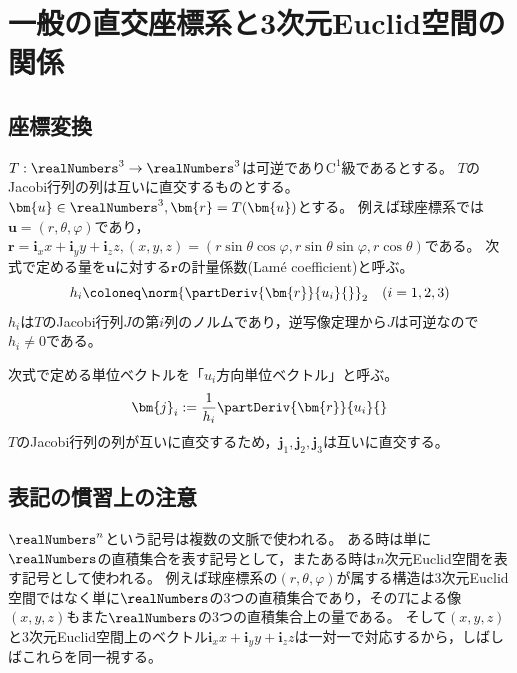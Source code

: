 \chapter{一般の直交座標系と3次元Euclid空間の関係}
    \section{座標変換}
        $T:\realNumbers^3\to\realNumbers^3$は可逆であり$\mathrm{C}^1$級であるとする。
        $T$のJacobi行列の列は互いに直交するものとする。
        $\bm{u}\in\realNumbers^3,\bm{r} = T(\bm{u})$とする。
        例えば球座標系では$\bm{u} = (r,\theta,\varphi)$であり，$\bm{r} = \bm{i}_x x + \bm{i}_y y + \bm{i}_z z,(x,y,z) = (r\sin\theta\cos\varphi,r\sin\theta\sin\varphi,r\cos\theta)$である。
        次式で定める量を$\bm{u}$に対する$\bm{r}$の計量係数(Lam\'{e} coefficient)と呼ぶ。
        \[ h_i \coloneq \norm{\partDeriv{\bm{r}}{u_i}{}}_2 \quad (i=1,2,3) \]
        $h_i$は$T$のJacobi行列$J$の第$i$列のノルムであり，逆写像定理から$J$は可逆なので$h_i \neq 0$である。
        \par
        次式で定める単位ベクトルを「$u_i$方向単位ベクトル」と呼ぶ。
        \[ \bm{j}_i := \frac{1}{h_i}\partDeriv{\bm{r}}{u_i}{} \]
        $T$のJacobi行列の列が互いに直交するため，$\bm{j}_1,\bm{j}_2,\bm{j}_3$は互いに直交する。
    \section{表記の慣習上の注意}
        $\realNumbers^n$という記号は複数の文脈で使われる。
        ある時は単に$\realNumbers$の直積集合を表す記号として，またある時は$n$次元Euclid空間を表す記号として使われる。
        例えば球座標系の$(r,\theta,\varphi)$が属する構造は3次元Euclid空間ではなく単に$\realNumbers$の3つの直積集合であり，その$T$による像$(x,y,z)$もまた$\realNumbers$の3つの直積集合上の量である。
        そして$(x,y,z)$と3次元Euclid空間上のベクトル$\bm{i}_x x + \bm{i}_y y + \bm{i}_z z$は一対一で対応するから，しばしばこれらを同一視する。
